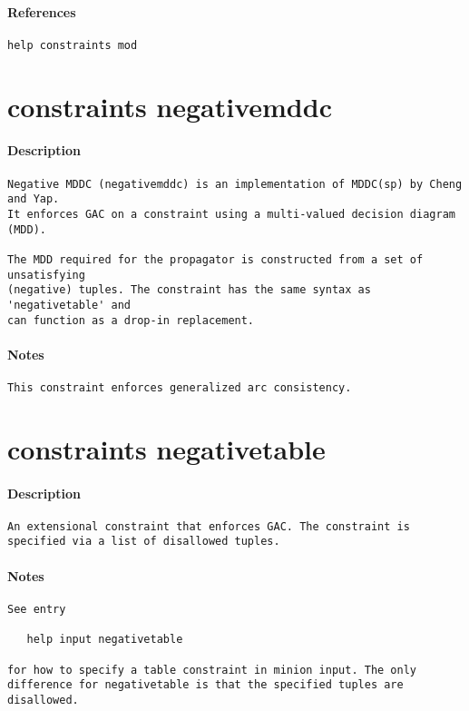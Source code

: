 \paragraph{References}
{\footnotesize
\begin{verbatim}
help constraints mod
\end{verbatim}
}
\section{constraints negativemddc}
\paragraph{Description}
{\footnotesize
\begin{verbatim}
Negative MDDC (negativemddc) is an implementation of MDDC(sp) by Cheng and Yap.
It enforces GAC on a constraint using a multi-valued decision diagram (MDD).

The MDD required for the propagator is constructed from a set of unsatisfying
(negative) tuples. The constraint has the same syntax as 'negativetable' and
can function as a drop-in replacement.
\end{verbatim}
}
\paragraph{Notes}
{\footnotesize
\begin{verbatim}
This constraint enforces generalized arc consistency.
\end{verbatim}
}
\section{constraints negativetable}
\paragraph{Description}
{\footnotesize
\begin{verbatim}
An extensional constraint that enforces GAC. The constraint is
specified via a list of disallowed tuples.
\end{verbatim}
}
\paragraph{Notes}
{\footnotesize
\begin{verbatim}
See entry

   help input negativetable

for how to specify a table constraint in minion input. The only
difference for negativetable is that the specified tuples are
disallowed.
\end{verbatim}
}
